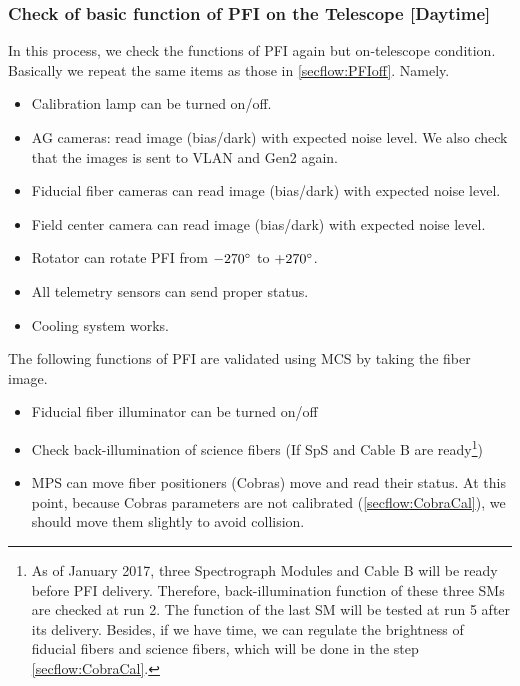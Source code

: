 \subsubsection{Check of basic function of PFI on the Telescope [Daytime]}\label{secflow:PFIon}


In this process, we check the functions of PFI again but on-telescope condition.
Basically we repeat the same items as those in \ref{secflow:PFIoff}.
Namely.
\begin{itemize}
\item Calibration lamp can be turned on/off.
\item AG cameras: read image (bias/dark) with expected noise level.
We also check that the images is sent to VLAN and Gen2 again.
\item Fiducial fiber cameras can read image (bias/dark) with expected noise level.
\item Field center camera can read image (bias/dark) with expected noise level.
\item Rotator can rotate PFI from $-270^\circ$ to $+270^\circ$.
\item All telemetry sensors can send proper status.
\item Cooling system works.
\end{itemize}

The following functions of PFI are validated using MCS by taking the fiber image.
\begin{itemize}
\item Fiducial fiber illuminator can be  turned on/off 
\item Check back-illumination of science fibers (If SpS and Cable B are ready\footnote{As of January 2017, three Spectrograph Modules and Cable B will be ready before PFI delivery. Therefore, back-illumination function of these three SMs are checked at run 2. The function of the last SM will be tested at run 5 after its delivery. Besides, if we have time, we can regulate the brightness of fiducial fibers and science fibers, which will be done in the step \ref{secflow:CobraCal}.})
\item MPS can move fiber positioners (Cobras) move and read their status.
At this point, because Cobras parameters are not calibrated (\ref{secflow:CobraCal}), we should move them slightly to avoid collision.
\end{itemize}


